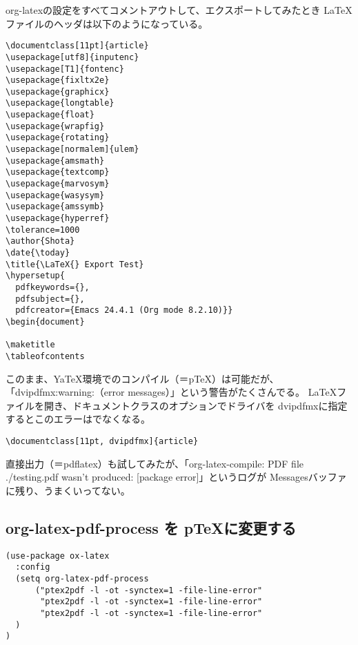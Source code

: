 \documentclass[dvipdfmx,12pt]{jsarticle}
\begin{document}
org-latexの設定をすべてコメントアウトして、エクスポートしてみたとき
\LaTeX{}ファイルのヘッダは以下のようになっている。

\lstset{language=[LaTeX]TeX,label= ,caption= ,numbers=none}
\begin{lstlisting}
\documentclass[11pt]{article}
\usepackage[utf8]{inputenc}
\usepackage[T1]{fontenc}
\usepackage{fixltx2e}
\usepackage{graphicx}
\usepackage{longtable}
\usepackage{float}
\usepackage{wrapfig}
\usepackage{rotating}
\usepackage[normalem]{ulem}
\usepackage{amsmath}
\usepackage{textcomp}
\usepackage{marvosym}
\usepackage{wasysym}
\usepackage{amssymb}
\usepackage{hyperref}
\tolerance=1000
\author{Shota}
\date{\today}
\title{\LaTeX{} Export Test}
\hypersetup{
  pdfkeywords={},
  pdfsubject={},
  pdfcreator={Emacs 24.4.1 (Org mode 8.2.10)}}
\begin{document}

\maketitle
\tableofcontents
\end{lstlisting}

このまま、YaTeX環境でのコンパイル（＝pTeX）は可能だが、
「dvipdfmx:warning:（error messages）」という警告がたくさんでる。
\LaTeX{}ファイルを開き、ドキュメントクラスのオプションでドライバを
dvipdfmxに指定するとこのエラーはでなくなる。

\lstset{language=[LaTeX]TeX,label= ,caption= ,numbers=none}
\begin{lstlisting}
\documentclass[11pt, dvipdfmx]{article}
\end{lstlisting}

直接出力（＝pdflatex）も試してみたが、「org-latex-compile: PDF file
./testing.pdf wasn't produced: [package error]」というログが
Messagesバッファに残り、うまくいってない。


\subsection{org-latex-pdf-process を pTeXに変更する}
\label{sec-4-2}

\lstset{language=Lisp,label= ,caption= ,numbers=none}
\begin{lstlisting}
(use-package ox-latex
  :config
  (setq org-latex-pdf-process
      ("ptex2pdf -l -ot -synctex=1 -file-line-error"
       "ptex2pdf -l -ot -synctex=1 -file-line-error"
       "ptex2pdf -l -ot -synctex=1 -file-line-error"
  )
)
\end{lstlisting}
\end{document}
